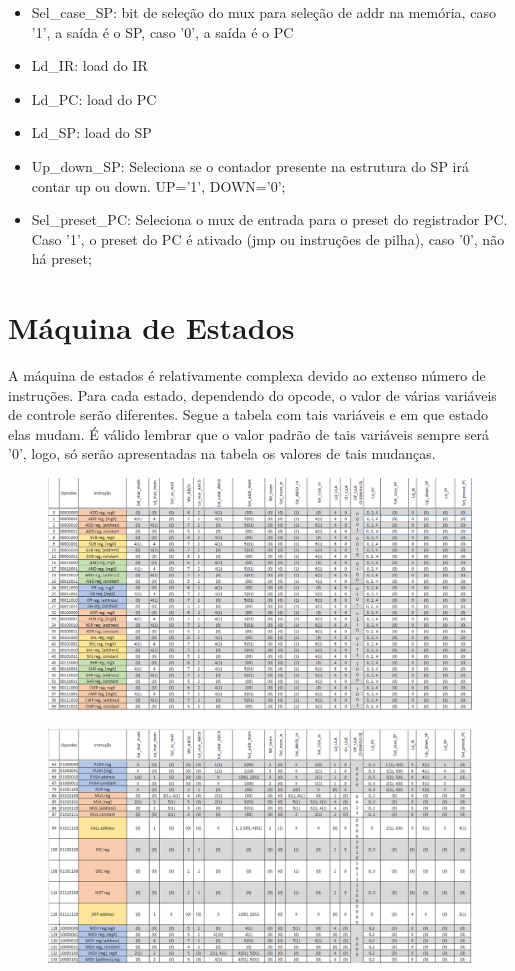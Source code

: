 \documentclass[12pt]{article}
\begin{document}
\begin{itemize}
\item Sel\_case\_SP: bit de seleção do mux para seleção de addr na memória, caso '1', a saída é o SP, caso '0', a saída é o PC
\item Ld\_IR: load do IR
\item Ld\_PC: load do PC
\item Ld\_SP: load do SP
\item Up\_down\_SP: Seleciona se o contador presente na estrutura do SP irá contar up ou down. UP='1', DOWN='0';
\item Sel\_preset\_PC: Seleciona o mux de entrada para o preset do registrador PC. Caso '1', o preset do PC é ativado (jmp ou instruções de pilha), caso '0', não há preset;
\end{itemize}

\section{Máquina de Estados}
A máquina de estados é relativamente complexa devido ao extenso número de instruções. Para cada estado, dependendo do opcode, o valor de várias variáveis de controle serão diferentes. Segue a tabela com tais variáveis e em que estado elas mudam. É válido lembrar que o valor padrão de tais variáveis sempre será '0', logo, só serão apresentadas na tabela os valores de tais mudanças.

\begin{figure}[!htbp]
\centering
\includegraphics[width=1\textwidth]{Figuras/mde1.png}
\end{figure}

\begin{figure}[!htbp]
\centering
\includegraphics[width=1\textwidth]{Figuras/mde2.png}
\end{figure}
\end{document}
